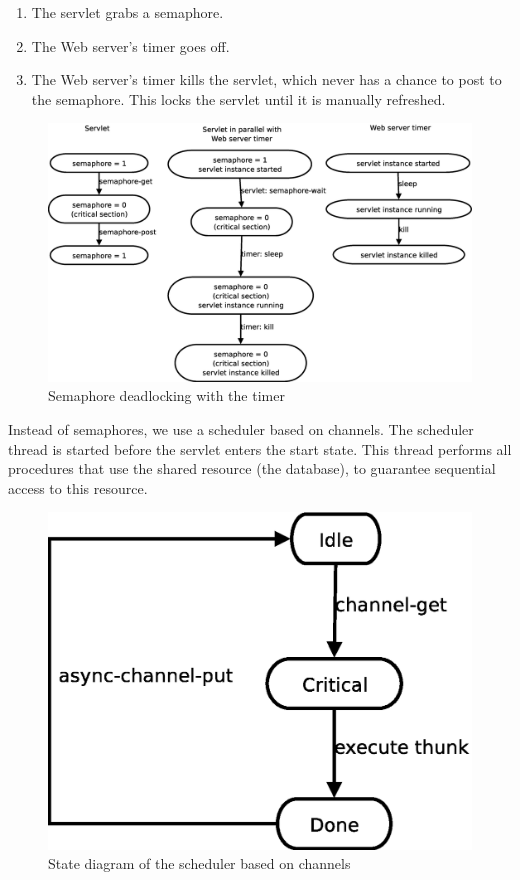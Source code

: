 \documentclass[a4paper]{article}
\begin{document}
\begin{enumerate}
\item{The servlet grabs a semaphore.}
\item{The Web server's timer goes off.}
\item{The Web server's timer kills the servlet, which never has a chance to
post to the semaphore. This locks the servlet until it is manually refreshed.}
\end{enumerate}



\begin{figure}[ht]
\centering
\includegraphics[scale=.30]{semaphore-deadlock.eps}
\caption{Semaphore deadlocking with the timer}
\label{fig:semaphores}
\end{figure}

Instead of semaphores, we use a scheduler based on channels. The scheduler
thread is started before the servlet enters the start state. This thread
performs all procedures that use the shared resource (the database), to
guarantee sequential access to this resource.

\begin{figure}[ht]
\centering
\includegraphics[scale=.30]{channel.eps}
\caption{State diagram of the scheduler based on channels}
\label{fig:channel}
\end{figure}
\end{document}

